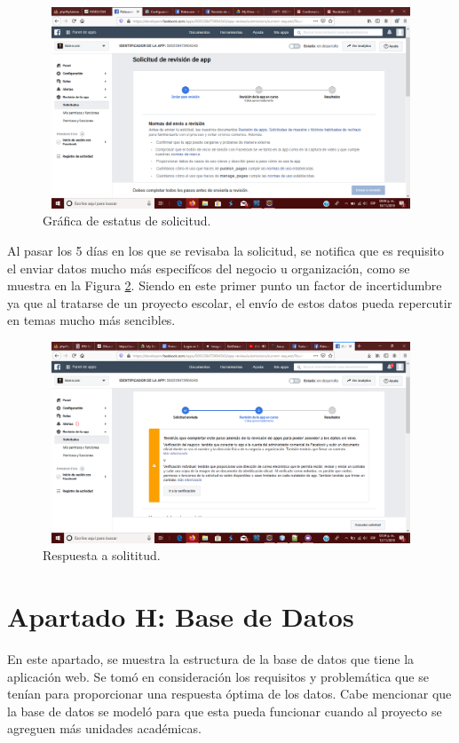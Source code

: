 	\begin{figure}[hbt!]
		\centering
		\includegraphics[width=15cm, height=6cm]{Imagenes/FacebookAPI/Facebook12}
		\caption{Gráfica de estatus de solicitud.}
		\label{creacionFB12}
	\end{figure}
\pagebreak
	\noindent Al pasar los 5 días en los que se revisaba la solicitud, se notifica que es requisito el enviar datos mucho más especifícos del negocio u organización, como se muestra en la Figura \ref{creacionFB16}. Siendo en este primer punto un factor de incertidumbre ya que al tratarse de un proyecto escolar, el envío de estos datos pueda repercutir en temas mucho más sencibles.

	\begin{figure}[hbt!]
		\centering
		\includegraphics[width=15cm, height=6cm]{Imagenes/FacebookAPI/Facebook16}
		\caption{Respuesta a solititud.}
		\label{creacionFB16}
	\end{figure}
	
	
	\chapter{Apartado H: Base de Datos}
	\noindent En este apartado, se muestra la estructura de la base de datos que tiene la aplicación web. Se tomó en consideración los requisitos y problemática que se tenían para proporcionar una respuesta óptima de los datos. Cabe mencionar que la base de datos se modeló para que esta pueda funcionar cuando al proyecto se agreguen más unidades académicas.
	
